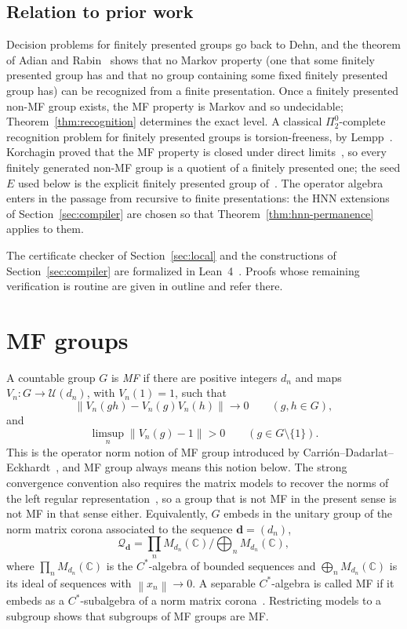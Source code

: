 \documentclass[11pt]{amsart}
\newcommand{\leanverified}[2]{\ignorespaces}
\theoremstyle{remark}
\theoremstyle{plain}
\newcommand{\C}{\mathbb C}
\newcommand{\U}{\mathcal U}
\newcommand{\opnorm}[1]{\left\lVert #1\right\rVert}
\begin{document}
\subsection*{Relation to prior work}

Decision problems for finitely presented groups go back to Dehn, and the
theorem of Adian and Rabin~\cite{Adian,Rabin} shows that no Markov
property (one that some finitely presented group has and that no group
containing some fixed finitely presented group has) can be recognized
from a finite presentation.  Once a finitely presented non-MF group exists,
the MF property is Markov and so undecidable; Theorem~\ref{thm:recognition}
determines the exact level.  A classical $\Pi^0_2$-complete recognition
problem for finitely presented groups is torsion-freeness, by
Lempp~\cite{Lempp}.  Korchagin proved that the MF property is closed under
direct limits~\cite[Proposition~13]{Korchagin}, so every finitely generated
non-MF group is a quotient of a finitely presented one; the seed $E$ used
below is the explicit finitely presented group of~\cite[Theorem~C]{NonMF}.
The operator algebra enters in the passage from recursive to finite
presentations: the HNN extensions of Section~\ref{sec:compiler} are chosen
so that Theorem~\ref{thm:hnn-permanence} applies to them.

The certificate checker of Section~\ref{sec:local} and the constructions of
Section~\ref{sec:compiler} are formalized in Lean~4~\cite{LeanDev}.  Proofs
whose remaining verification is routine are given in outline and refer
there.

\section{MF groups}\label{sec:prelim}

A countable group $G$ is \emph{MF} if there are positive
integers $d_n$ and maps $V_n\colon G\to\U(d_n)$, with $V_n(1)=1$, such that
\[
 \opnorm{V_n(gh)-V_n(g)V_n(h)}\longrightarrow0
 \qquad(g,h\in G),
\]
and
\[
 \limsup_n\opnorm{V_n(g)-1}>0
 \qquad(g\in G\setminus\{1\}).
\]
This is the operator norm notion of MF group introduced by
Carri\'on--Dadarlat--Eckhardt~\cite{CDE}, and MF group always means this
notion below.  The strong convergence convention also requires the matrix
models to recover the norms of the left regular
representation~\cite{GaoEtAl,Schafhauser}, so a group that is not MF in the
present sense is not MF in that sense either.  Equivalently, $G$ embeds in
the unitary group of the norm matrix corona associated to the sequence
$\mathbf d=(d_n)$,
\[
 \mathcal Q_{\mathbf d}
 =\prod_nM_{d_n}(\C)\big/\bigoplus_nM_{d_n}(\C),
\]
where $\prod_nM_{d_n}(\C)$ is the $C^*$-algebra of bounded sequences and
$\bigoplus_nM_{d_n}(\C)$ is its ideal of sequences with
$\opnorm{x_n}\to0$.  A separable $C^*$-algebra is called MF if it embeds as
a $C^*$-subalgebra of a norm matrix corona~\cite{BK}.  Restricting models
to a subgroup shows that subgroups of MF groups are MF\@.
\leanverified{Sofic/MFDefinitions}{GroupApproximation.standardMFDefinitions_iff}
\leanverified{Sofic/OperatorMFPositiveControls}{GroupApproximation.IsOperatorMF.subgroup}
\end{document}
